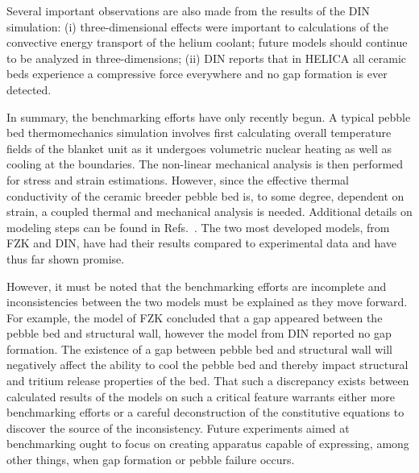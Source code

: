 Several important observations are also made from the results of the DIN simulation: (i) three-dimensional effects were important to calculations of the convective energy transport of the helium coolant; future models should continue to be analyzed in three-dimensions; (ii) DIN reports that in HELICA all ceramic beds experience a compressive force everywhere and no gap formation is ever detected. 

In summary, the benchmarking efforts have only recently begun. A typical pebble bed thermomechanics simulation involves first calculating overall temperature fields of the blanket unit as it undergoes volumetric nuclear heating as well as cooling at the boundaries. The non-linear mechanical analysis is then performed for stress and strain estimations. However, since the effective thermal conductivity of the ceramic breeder pebble bed is, to some degree, dependent on strain, a coupled thermal and mechanical analysis is needed. Additional details on modeling steps can be found in Refs.~\cite{DellOrco:2010zr,DiMaio20081287,DiMaio20101234,Gan:2009vn,Gan:2010lh,dellorco:2006}. The two most developed models, from FZK and DIN, have had their results compared to experimental data and have thus far shown promise. 

However, it must be noted that the benchmarking efforts are incomplete and inconsistencies between the two models must be explained as they move forward. For example, the model of FZK concluded that a gap appeared between the pebble bed and structural wall, however the model from DIN reported no gap formation. The existence of a gap between pebble bed and structural wall will negatively affect the ability to cool the pebble bed and thereby impact structural and tritium release properties of the bed. That such a discrepancy exists between calculated results of the models on such a critical feature warrants either more benchmarking efforts or a careful deconstruction of the constitutive equations to discover the source of the inconsistency. Future experiments aimed at benchmarking ought to focus on creating apparatus capable of expressing, among other things, when gap formation or pebble failure occurs.


